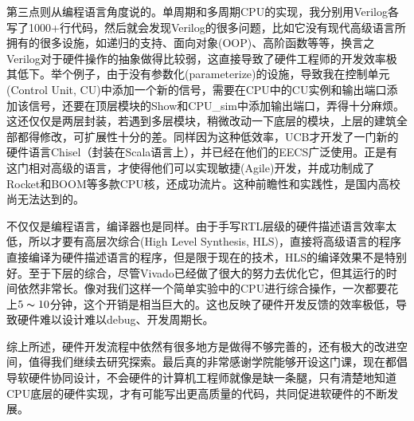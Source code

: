 \documentclass[12pt,UTF8]{ctexart}
\begin{document}
\begin{spacing}{1.1}
\par 第三点则从编程语言角度说的。单周期和多周期CPU的实现，我分别用Verilog各写了1000+行代码，然后就会发现Verilog的很多问题，比如它没有现代高级语言所拥有的很多设施，如递归的支持、面向对象(OOP)、高阶函数等等，换言之Verilog对于硬件操作的抽象做得比较弱，这直接导致了硬件工程师的开发效率极其低下。举个例子，由于没有参数化(parameterize)的设施，导致我在控制单元(Control Unit, CU)中添加一个新的信号，需要在CPU中的CU实例和输出端口添加该信号，还要在顶层模块的Show和CPU\_sim中添加输出端口，弄得十分麻烦。这还仅仅是两层封装，若遇到多层模块，稍微改动一下底层的模块，上层的建筑全部都得修改，可扩展性十分的差。同样因为这种低效率，UCB才开发了一门新的硬件语言Chisel（封装在Scala语言上），并已经在他们的EECS广泛使用。正是有这门相对高级的语言，才使得他们可以实现敏捷(Agile)开发，并成功制成了Rocket和BOOM等多款CPU核，还成功流片。这种前瞻性和实践性，是国内高校尚无法达到的。
\par 不仅仅是编程语言，编译器也是同样。由于手写RTL层级的硬件描述语言效率太低，所以才要有高层次综合(High Level Synthesis, HLS)，直接将高级语言的程序直接编译为硬件描述语言的程序，但是限于现在的技术，HLS的编译效果不是特别好。至于下层的综合，尽管Vivado已经做了很大的努力去优化它，但其运行的时间依然非常长。像对我们这样一个简单实验中的CPU进行综合操作，一次都要花上$5\thicksim 10$分钟，这个开销是相当巨大的。这也反映了硬件开发反馈的效率极低，导致硬件难以设计难以debug、开发周期长。
\par 综上所述，硬件开发流程中依然有很多地方是做得不够完善的，还有极大的改进空间，值得我们继续去研究探索。最后真的非常感谢学院能够开设这门课，现在都倡导软硬件协同设计，不会硬件的计算机工程师就像是缺一条腿，只有清楚地知道CPU底层的硬件实现，才有可能写出更高质量的代码，共同促进软硬件的不断发展。



\end{spacing}
\end{document}
